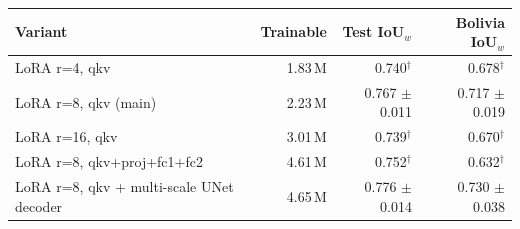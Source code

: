 \begin{tabular}{lrrr}
\toprule
Variant & Trainable & Test IoU$_w$ & Bolivia IoU$_w$ \\
\midrule
LoRA r=4, qkv & 1.83\,M & 0.740$^\dagger$ & 0.678$^\dagger$ \\
LoRA r=8, qkv (main) & 2.23\,M & 0.767 $\pm$ 0.011 & 0.717 $\pm$ 0.019 \\
LoRA r=16, qkv & 3.01\,M & 0.739$^\dagger$ & 0.670$^\dagger$ \\
LoRA r=8, qkv+proj+fc1+fc2 & 4.61\,M & 0.752$^\dagger$ & 0.632$^\dagger$ \\
LoRA r=8, qkv + multi-scale UNet decoder & 4.65\,M & 0.776 $\pm$ 0.014 & 0.730 $\pm$ 0.038 \\
\bottomrule
\end{tabular}
